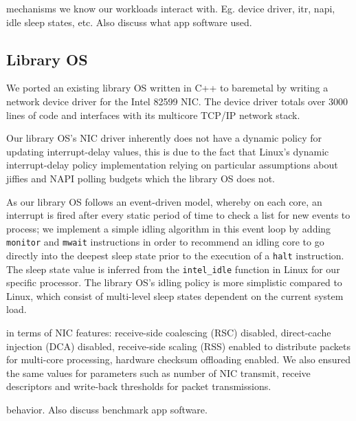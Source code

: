 mechanisms we know our workloads interact with.  Eg.  device driver, itr, napi,
idle sleep states, etc. Also discuss what app software used.

\subsection{Library OS}
We ported an existing library OS written in C++ to baremetal by writing a
network device driver for the Intel 82599 NIC. The device driver totals over
3000 lines of code and interfaces with its multicore TCP/IP network stack.

Our library OS's NIC driver inherently does not have a dynamic policy for
updating interrupt-delay values, this is due to the fact that Linux's dynamic
interrupt-delay policy implementation relying on particular assumptions about
jiffies and NAPI polling budgets which the library OS does not.

As our library OS follows an event-driven model, whereby on each core, an
interrupt is fired after every static period of time to check a list for new
events to process; we implement a simple idling algorithm in this event loop by
adding \texttt{monitor} and \texttt{mwait} instructions in order to recommend
an idling core to go directly into the deepest sleep state prior to the
execution of a \texttt{halt} instruction. The sleep state value is inferred
from the \texttt{intel\_idle} function in Linux for our specific processor. The
library OS's idling policy is more simplistic compared to Linux, which consist
of multi-level sleep states dependent on the current system load.

in terms of NIC features: receive-side coalescing (RSC) disabled, direct-cache
injection (DCA) disabled, receive-side scaling (RSS) enabled to distribute
packets for multi-core processing, hardware checksum offloading enabled. We
also ensured the same values for parameters such as number of NIC transmit,
receive descriptors and write-back thresholds for packet transmissions.

behavior. Also discuss benchmark app software.




